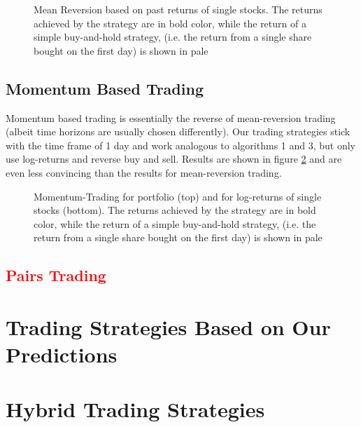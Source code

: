 \begin{figure}[h!]
    \centering
    \begin{adjustbox}{width=.95\textwidth,center}
        
    \end{adjustbox}  
    \caption{Mean Reversion based on past returns of single stocks. The returns achieved by the strategy are in bold color, while the return of a simple buy-and-hold strategy, (i.e. the return from a single share bought on the first day) is shown in pale}
    \label{fig:mean_reversion_returns}
\end{figure}{}

\subsection{Momentum Based Trading}
Momentum based trading is essentially the reverse of mean-reversion trading (albeit time horizons are usually chosen differently). Our trading strategies stick with the time frame of 1 day and work analogous to algorithms 1 and 3, but only use log-returns and reverse buy and sell. Results are shown in figure \ref{fig:momentum-trading} and are even less convincing than the results for mean-reversion trading. 

\begin{figure}[h!]
    \centering
    \begin{adjustbox}{width=.95\textwidth,center}
        
    \end{adjustbox}  
    \begin{adjustbox}{width=.95\textwidth,center}
    \end{adjustbox}      
    \caption{Momentum-Trading for portfolio (top) and for log-returns of single stocks (bottom). The returns achieved by the strategy are in bold color, while the return of a simple buy-and-hold strategy, (i.e. the return from a single share bought on the first day) is shown in pale}
    \label{fig:momentum-trading}
\end{figure}{}


\subsection{\textcolor{red}{Pairs Trading}}



\section{Trading Strategies Based on Our Predictions}



\section{Hybrid Trading Strategies}



